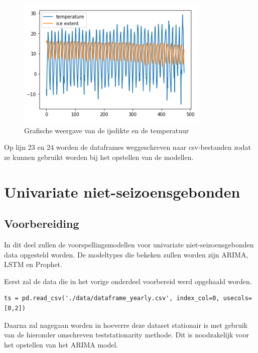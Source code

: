 \begin{figure}
    \centering
    \caption{Grafische weergave van de ijsdikte en de temperatuur}
    \label{fig:combinedmonths}
    \includegraphics[width=0.7\linewidth]{combined_months.PNG}
\end{figure}

Op lijn 23 en 24 worden de dataframes weggeschreven naar csv-bestanden zodat ze kunnen gebruikt worden bij het opstellen van de modellen.


\section{Univariate niet-seizoensgebonden}
\subsection{Voorbereiding}

In dit deel zullen de voorspellingsmodellen voor univariate niet-seizoensgebonden data opgesteld worden. De modeltypes die bekeken zullen worden zijn ARIMA, LSTM en Prophet.

Eerst zal de data die in het vorige onderdeel voorbereid werd opgehaald worden.

\begin{verbatim}
ts = pd.read_csv('./data/dataframe_yearly.csv', index_col=0, usecols=[0,2])
\end{verbatim}

Daarna zal nagegaan worden in hoeverre deze dataset stationair is met gebruik van de hieronder omschreven test\textunderscore stationarity methode. Dit is noodzakelijk voor het opstellen van het ARIMA model.

